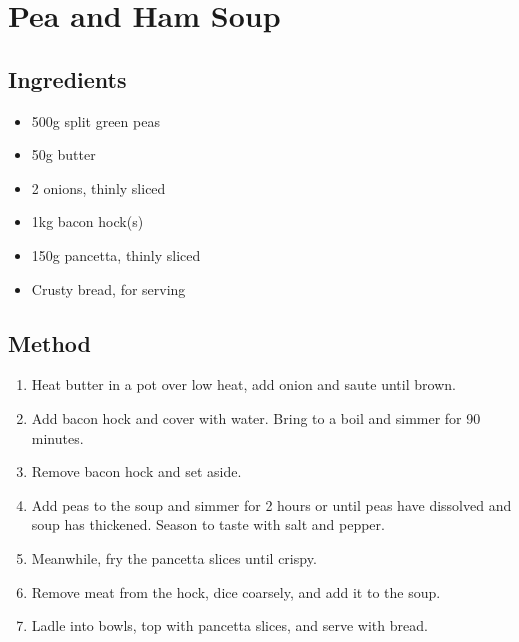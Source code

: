 \clearpage
\section{Pea and Ham Soup}


\subsection{Ingredients}

\begin{itemize}
    \item 500g split green peas
    \item 50g butter
    \item 2 onions, thinly sliced
    \item 1kg bacon hock(s)
    \item 150g pancetta, thinly sliced
    \item Crusty bread, for serving
\end{itemize}

\subsection{Method}

\begin{enumerate}
    \item Heat butter in a pot over low heat, add onion and saute until brown.
    \item Add bacon hock and cover with water. Bring to a boil and simmer for 90 minutes.
    \item Remove bacon hock and set aside.
    \item Add peas to the soup and simmer for 2 hours or until peas have dissolved and soup has thickened. Season to taste with salt and pepper.
    \item Meanwhile, fry the pancetta slices until crispy.
    \item Remove meat from the hock, dice coarsely, and add it to the soup.
    \item Ladle into bowls, top with pancetta slices, and serve with bread.
\end{enumerate}
